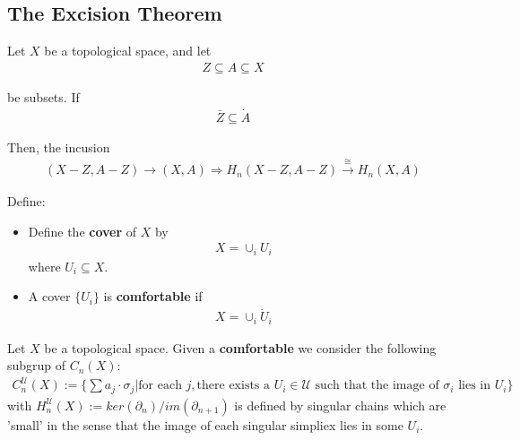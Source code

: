 \documentclass[Total.tex]{subfiles}
\begin{document}
			\subsection{The Excision Theorem}
				\begin{theorem}
					Let $X$ be a topological space, and let 
					\begin{gather*}
						Z\subseteq A\subseteq X
					\end{gather*}
					
					be subsets. If
					\begin{gather*}
						\bar{Z}\subseteq \dot{A}
					\end{gather*}
					
					Then, the incusion
					\begin{gather*}
						(X-Z,A-Z)\rightarrow (X,A)\Rightarrow H_n(X-Z,A-Z)\stackrel{\cong}{\rightarrow} H_n(X,A)
					\end{gather*}
				\end{theorem}
				\begin{Def}
					Define:
					\begin{itemize}
						\item Define the \textbf{cover} of $X$ by
						\begin{gather*}
							X=\cup_i U_i
						\end{gather*}
						where $U_i\subseteq X$.
						\item A cover $\{U_i\}$ is \textbf{comfortable} if 
						\begin{gather*}
							X=\cup_i \dot{U}_i
						\end{gather*}
					\end{itemize}
				\end{Def}
				
				\begin{Def}
					Let $X$ be a topological space. Given a \textbf{comfortable } we consider the following subgrup of $C_n(X)$:
					\begin{gather*}
						C_n^\mathcal{U}(X):=\{\sum a_j\cdot \sigma_j|\mbox{for each }j,\mbox{there exists a }U_i\in \mathcal{U}\mbox{ such that the image of }\sigma_i\mbox{ lies in }U_i\}
					\end{gather*}
					with $H^\mathcal{U}_n(X):=ker(\partial_n)/im(\partial_{n+1})$ is defined by singular chains which are 'small' in the sense that the image of each singular simpliex lies in some $U_i$.
				\end{Def}
				
\end{document}
